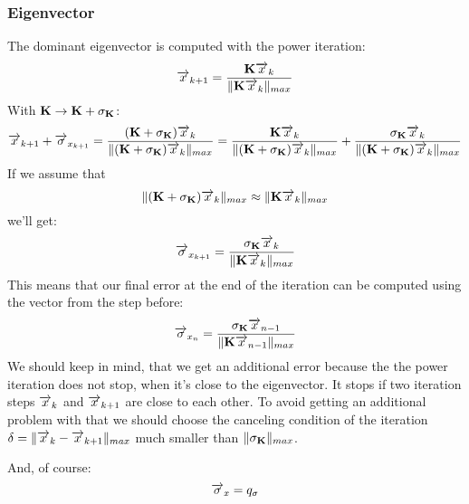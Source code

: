 \subsubsection*{Eigenvector}
The dominant eigenvector is computed with the power iteration:
\begin{equation}
\overrightarrow{x}_{k+1} = \frac{\mathbf{K} \overrightarrow{x}_k}{\Vert{\ensuremath{\mathbf{K}} \ensuremath{\overrightarrow{x}}_k}\Vert_{max}}
\end{equation}
With $ \mathbf{K} \rightarrow \mathbf{K} + \mathbf{\sigma_K} $:
\begin{equation}
\overrightarrow{x}_{k+1} + \overrightarrow{\sigma}_{x_{k+1}} = \frac{(\mathbf{K} + \mathbf{\sigma_K}) \overrightarrow{x}_k}{\Vert{(\ensuremath{\mathbf{K}} + \ensuremath{\mathbf{\sigma_K}}) \ensuremath{\overrightarrow{x}}_k}\Vert_{max}} = \frac{\mathbf{K} \overrightarrow{x}_k}{\Vert{(\ensuremath{\mathbf{K}} + \ensuremath{\mathbf{\sigma_K}}) \ensuremath{\overrightarrow{x}}_k}\Vert_{max}} + \frac{\mathbf{\sigma_K} \overrightarrow{x}_k}{\Vert{(\ensuremath{\mathbf{K}} + \ensuremath{\mathbf{\sigma_K}}) \ensuremath{\overrightarrow{x}}_k}\Vert_{max}}
\end{equation}
If we assume that
\begin{equation}
\Vert{(\ensuremath{\mathbf{K}} + \ensuremath{\mathbf{\sigma_K}}) \ensuremath{\overrightarrow{x}}_k}\Vert_{max} \approx \Vert{\ensuremath{\mathbf{K}} \ensuremath{\overrightarrow{x}}_k}\Vert_{max}
\end{equation}
we'll get:
\begin{equation}
\overrightarrow{\sigma}_{x_{k+1}} = \frac{\mathbf{\sigma_K} \overrightarrow{x}_k}{\Vert{\ensuremath{\mathbf{K}}\ensuremath{\overrightarrow{x}}_k}\Vert_{max}}
\end{equation}
This means that our final error at the end of the iteration can be computed using the vector from the step before:
\begin{equation}
\overrightarrow{\sigma}_{x_n} = \frac{\mathbf{\sigma_K} \overrightarrow{x}_{n-1}}{\Vert{\ensuremath{\mathbf{K}}\ensuremath{\overrightarrow{x}}_{n-1}}\Vert_{max}}
\end{equation}
We should keep in mind, that we get an additional error because the the power iteration does not stop, when it's close to the eigenvector. It stops if two iteration steps $\overrightarrow{x}_k $ and $\overrightarrow{x}_{k+1} $ are close to each other. To avoid getting an additional problem with that we should choose the canceling condition of the iteration $\delta = \Vert{\ensuremath{\overrightarrow{x}}_k-\ensuremath{\overrightarrow{x}}_{k+1}}\Vert_{max} $ much smaller than $\Vert{\ensuremath{\mathbf{\sigma_K}}}\Vert_{max} $.

And, of course:
\begin{equation}
\overrightarrow{\sigma}_x = q_{\sigma}
\end{equation}

